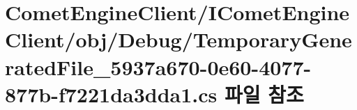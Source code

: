 \hypertarget{_comet_engine_client_2_i_comet_engine_client_2obj_2_debug_2_temporary_generated_file__5937a670-0e60-4077-877b-f7221da3dda1_8cs}{}\section{Comet\+Engine\+Client/\+I\+Comet\+Engine\+Client/obj/\+Debug/\+Temporary\+Generated\+File\+\_\+5937a670-\/0e60-\/4077-\/877b-\/f7221da3dda1.cs 파일 참조}
\label{_comet_engine_client_2_i_comet_engine_client_2obj_2_debug_2_temporary_generated_file__5937a670-0e60-4077-877b-f7221da3dda1_8cs}

